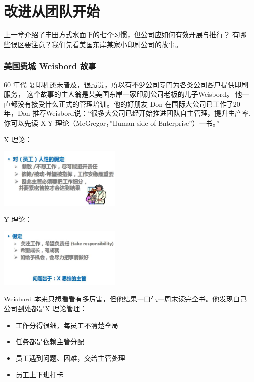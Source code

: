 \chapter{改进从团队开始} %

上一章介绍了丰田方式水面下的七个习惯，但公司应如何有效开展与推行？
有哪些误区要注意？我们先看美国东岸某家小印刷公司的故事。

\hypertarget{ux7f8eux56fdux8d39ux57ce-weisbord-ux6545ux4e8b}{%
\subsection{美国费城 Weisbord
故事}\label{ux7f8eux56fdux8d39ux57ce-weisbord-ux6545ux4e8b}}

60 年代 复印机还未普及，很昂贵，所以有不少公司专门为各类公司客户提供印刷服务，
这个故事的主人翁是某美国东岸一家印刷公司老板的儿子Weisbord。
他一直都没有接受什么正式的管理培训。他的好朋友 Don
在国际大公司已工作了20 年，Don 
推荐Weisbord说：``很多大公司已经开始推进团队自主管理，提升生产率, 
你可以先读 X-Y 理论（McGregor，''Human side of Enterprise''）一书。''

X 理论：


\includegraphics[width=6cm]{0A_Agile_stories_p2.jpg}

Y 理论：


\includegraphics[width=6cm]{0A_Agile_stories_p3.jpg}

Weisbord
本来只想看看有多厉害，但他结果一口气一周末读完全书。他发现自己公司到处都是X
理论管理：

\begin{itemize}
\tightlist
\item
  工作分得很细，每员工不清楚全局
\item
  任务都是依赖主管分配
\item
  员工遇到问题、困难，交给主管处理
\item
  员工上下班打卡
\end{itemize}

